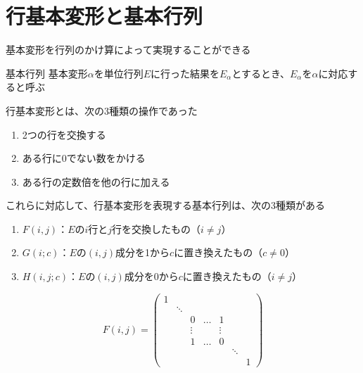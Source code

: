 \documentclass[../../../topic_linear-algebra]{subfiles}
\begin{document}
\sectionline
\section{行基本変形と基本行列}

基本変形を行列のかけ算によって実現することができる

\begin{definition*}{基本行列}
  基本変形$\alpha$を単位行列$E$に行った結果を$E_\alpha$とするとき、$E_\alpha$を$\alpha$に対応すると呼ぶ
\end{definition*}

行基本変形とは、次の3種類の操作であった

\begin{enumerate}[label=\romanlabel]
  \item 2つの行を交換する
  \item ある行に0でない数をかける
  \item ある行の定数倍を他の行に加える
\end{enumerate}

これらに対応して、行基本変形を表現する基本行列は、次の3種類がある

\begin{enumerate}[label=\romanlabel]
  \item $F(i,j)$：$E$の$i$行と$j$行を交換したもの（$i\neq j$）
  \item $G(i;c)$：$E$の$(i,j)$成分を1から$c$に置き換えたもの（$c\neq 0$）
  \item $H(i,j;c)$：$E$の$(i,j)$成分を0から$c$に置き換えたもの（$i \neq j$）
\end{enumerate}

\begin{equation*}
  F(i,j) = \begin{pmatrix}
    1                                                \\
     & \ddots                                        \\
     &        & 0      & \dots & 1                   \\
     &        & \vdots &       & \vdots              \\
     &        & 1      & \dots & 0                   \\
     &        &        &       &        & \ddots     \\
     &        &        &       &        &        & 1
  \end{pmatrix}
\end{equation*}
\end{document}
